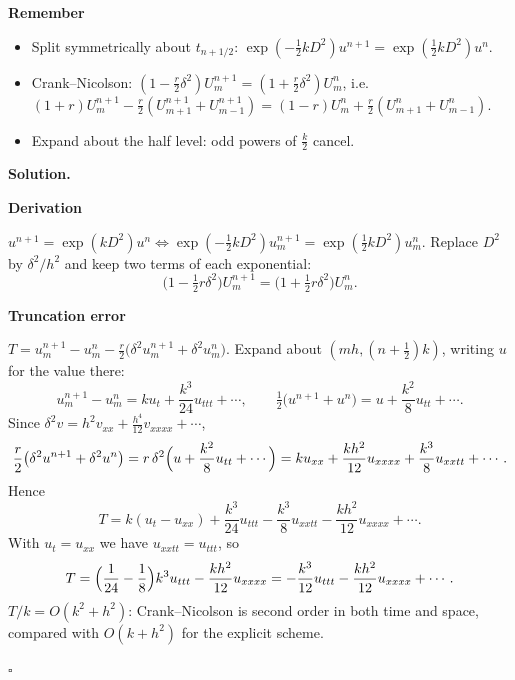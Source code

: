 \documentclass[11pt,a4paper]{article}
\newenvironment{rem}
  {\begin{remember}\noindent\textbf{Remember}\par\nobreak\vspace{-0.3em}}
  {\end{remember}}
\newenvironment{solution}
  {\par\noindent\textbf{Solution.}\par\nobreak}
  {\par\nobreak\noindent\hfill\(\square\)\par}
\newcommand{\step}[1]{\par\addvspace{0.5em}\noindent\textbf{#1}\par\nobreak}
\begin{document}
\begin{rem}
\begin{itemize}
  \item Split symmetrically about \(t_{n+1/2}\):
    \(\exp(-\frac12kD^2)u^{n+1}=\exp(\frac12kD^2)u^n\).
  \item Crank--Nicolson:
    \((1-\frac r2\delta^2)U_m^{n+1}=(1+\frac r2\delta^2)U_m^n\), i.e.\
    \((1+r)U_m^{n+1}-\frac r2(U_{m+1}^{n+1}+U_{m-1}^{n+1})
    =(1-r)U_m^n+\frac r2(U_{m+1}^n+U_{m-1}^n)\).
  \item Expand about the half level: odd powers of \(\frac k2\) cancel.
\end{itemize}
\end{rem}

\begin{solution}
\step{Derivation}
\(u^{n+1}=\exp(kD^2)u^n\iff\exp(-\frac12kD^2)u_m^{n+1}=\exp(\frac12kD^2)u_m^n\).
Replace \(D^2\) by \(\delta^2/h^2\) and keep two terms of each
exponential:
\[
  \bigl(1-\tfrac12r\delta^2\bigr)U_m^{n+1}=\bigl(1+\tfrac12r\delta^2\bigr)U_m^n .
\]

\step{Truncation error}
\(T=u_m^{n+1}-u_m^n-\frac r2\bigl(\delta^2u_m^{n+1}+\delta^2u_m^n\bigr)\).
Expand about \((mh,(n+\frac12)k)\), writing \(u\) for the value
there:
\[
  u_m^{n+1}-u_m^n=ku_t+\frac{k^3}{24}u_{ttt}+\cdots,
  \qquad
  \tfrac12\bigl(u^{n+1}+u^n\bigr)=u+\frac{k^2}8u_{tt}+\cdots .
\]
Since \(\delta^2v=h^2v_{xx}+\frac{h^4}{12}v_{xxxx}+\cdots\),
\[
  \frac r2\bigl(\delta^2u^{n+1}+\delta^2u^n\bigr)
  =r\,\delta^2\Bigl(u+\frac{k^2}8u_{tt}+\cdots\Bigr)
  =ku_{xx}+\frac{kh^2}{12}u_{xxxx}+\frac{k^3}8u_{xxtt}+\cdots .
\]
Hence
\[
  T=k(u_t-u_{xx})+\frac{k^3}{24}u_{ttt}-\frac{k^3}8u_{xxtt}-\frac{kh^2}{12}u_{xxxx}+\cdots .
\]
With \(u_t=u_{xx}\) we have \(u_{xxtt}=u_{ttt}\), so
\[
  T=\Bigl(\frac1{24}-\frac18\Bigr)k^3u_{ttt}-\frac{kh^2}{12}u_{xxxx}
  =-\frac{k^3}{12}u_{ttt}-\frac{kh^2}{12}u_{xxxx}+\cdots .
\]
\(T/k=O(k^2+h^2)\): Crank--Nicolson is second order in both time and
space, compared with \(O(k+h^2)\) for the explicit scheme.
\end{solution}
\end{document}

